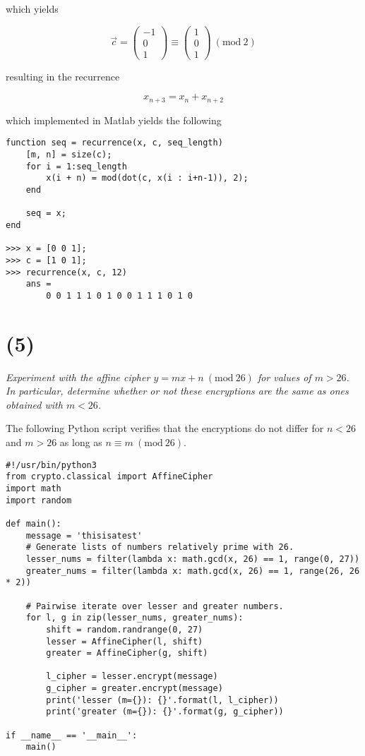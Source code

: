 \documentclass[12pt]{article}
\renewcommand{\mod}[1]{\mathrm{mod}\ #1}
\renewcommand{\pmod}[1]{\ (\mod{#1})}
\begin{document}
which yields

$$\vec{c} = \begin{pmatrix}-1 \\ 0 \\ 1\end{pmatrix} \equiv \begin{pmatrix}1 \\ 0 \\ 1\end{pmatrix} \pmod{2}$$

resulting in the recurrence

$$x_{n + 3} = x_n + x_{n + 2}$$

which implemented in Matlab yields the following

\begin{verbatim}
function seq = recurrence(x, c, seq_length)
    [m, n] = size(c);
    for i = 1:seq_length
        x(i + n) = mod(dot(c, x(i : i+n-1)), 2);
    end

    seq = x;
end

>>> x = [0 0 1];
>>> c = [1 0 1];
>>> recurrence(x, c, 12)
    ans =
        0 0 1 1 1 0 1 0 0 1 1 1 0 1 0
\end{verbatim}

\section*{(5)} \textit{Experiment with the affine cipher $y = m x + n \pmod{26}$ for values of $m > 26$. In particular, determine whether or not these encryptions are the same as ones obtained with $m < 26$.}

The following Python script verifies that the encryptions do not differ for $n < 26$ and $m > 26$ as long as $n \equiv m \pmod{26}$.

\begin{verbatim}
#!/usr/bin/python3
from crypto.classical import AffineCipher
import math
import random

def main():
    message = 'thisisatest'
    # Generate lists of numbers relatively prime with 26.
    lesser_nums = filter(lambda x: math.gcd(x, 26) == 1, range(0, 27))
    greater_nums = filter(lambda x: math.gcd(x, 26) == 1, range(26, 26 * 2))

    # Pairwise iterate over lesser and greater numbers.
    for l, g in zip(lesser_nums, greater_nums):
        shift = random.randrange(0, 27)
        lesser = AffineCipher(l, shift)
        greater = AffineCipher(g, shift)

        l_cipher = lesser.encrypt(message)
        g_cipher = greater.encrypt(message)
        print('lesser (m={}): {}'.format(l, l_cipher))
        print('greater (m={}): {}'.format(g, g_cipher))

if __name__ == '__main__':
    main()
\end{verbatim}
\end{document}
